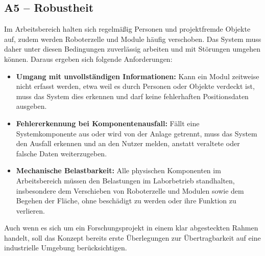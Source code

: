\subsection{A5 -- Robustheit}
\label{subsec:Robustheit}
Im Arbeitsbereich halten sich regelmäßig Personen und projektfremde Objekte auf, zudem werden Roboterzelle und Module häufig verschoben. Das System muss daher unter diesen Bedingungen zuverlässig arbeiten und mit Störungen umgehen können. Daraus ergeben sich folgende Anforderungen:
\begin{itemize}
    \item \textbf{Umgang mit unvollständigen Informationen:} Kann ein Modul zeitweise nicht erfasst werden, etwa weil es durch Personen oder Objekte verdeckt ist, muss das System dies erkennen und darf keine fehlerhaften Positionsdaten ausgeben.
    \item \textbf{Fehlererkennung bei Komponentenausfall:} Fällt eine Systemkomponente aus oder wird von der Anlage getrennt, muss das System den Ausfall erkennen und an den Nutzer melden, anstatt veraltete oder falsche Daten weiterzugeben.
    \item \textbf{Mechanische Belastbarkeit:} Alle physischen Komponenten im Arbeitsbereich müssen den Belastungen im Laborbetrieb standhalten, insbesondere dem Verschieben von Roboterzelle und Modulen sowie dem Begehen der Fläche, ohne beschädigt zu werden oder ihre Funktion zu verlieren.
\end{itemize}
Auch wenn es sich um ein Forschungsprojekt in einem klar abgesteckten Rahmen handelt, soll das Konzept bereits erste Überlegungen zur Übertragbarkeit auf eine industrielle Umgebung berücksichtigen.

